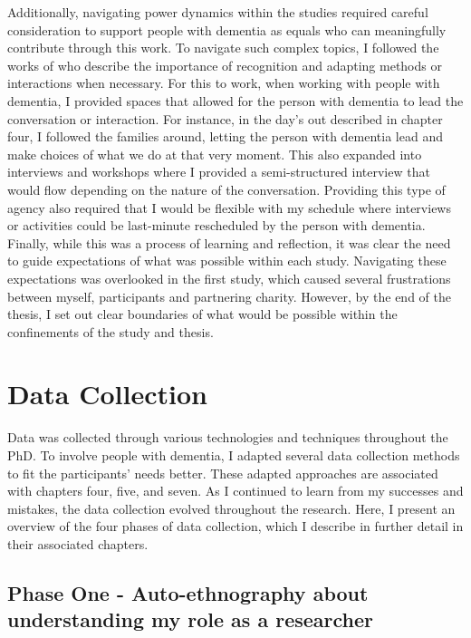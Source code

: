 Additionally, navigating power dynamics within the studies required careful consideration to support people with dementia as equals who can meaningfully contribute through this work. To navigate such complex topics, I followed the works of \cite{foley_struggle_2019,morrissey_value_2017, lazar_critical_2017} who describe the importance of recognition and adapting methods or interactions when necessary. For this to work, when working with people with dementia, I provided spaces that allowed for the person with dementia to lead the conversation or interaction. For instance, in the day's out described in chapter four, I followed the families around, letting the person with dementia lead and make choices of what we do at that very moment. This also expanded into interviews and workshops where I provided a semi-structured interview that would flow depending on the nature of the conversation. Providing this type of agency also required that I would be flexible with my schedule where interviews or activities could be last-minute rescheduled by the person with dementia. Finally, while this was a process of learning and reflection, it was clear the need to guide expectations of what was possible within each study. Navigating these expectations was overlooked in the first study, which caused several frustrations between myself, participants and partnering charity. However, by the end of the thesis, I set out clear boundaries of what would be possible within the confinements of the study and thesis.

\section{Data Collection}
\label{Method:DataCollection}
Data was collected through various technologies and techniques throughout the PhD. To involve people with dementia, I adapted several data collection methods to fit the participants' needs better. These adapted approaches are associated with chapters four, five, and seven. As I continued to learn from my successes and mistakes, the data collection evolved throughout the research. Here, I present an overview of the four phases of data collection, which I describe in further detail in their associated chapters.

\subsection{Phase One - Auto-ethnography about understanding my role as a researcher}

